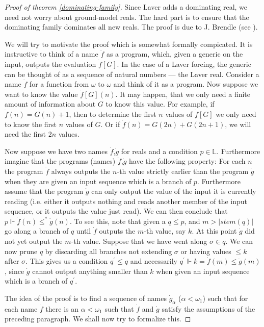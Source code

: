 \documentclass[a4paper,11pt,oneside]{mybook}
\def\force{\Vdash}
\theoremstyle{theorem}
\theoremstyle{example}
\begin{document}
\begin{proof}[Proof of theorem \ref{dominating-family}] Since Laver adds a dominating real, we need not worry about ground-model reals. The hard part is to ensure that the dominating family dominates all new reals. The proof is due to J. Brendle (see \cite{brendle-combinatorial}).

We will try to motivate the proof which is somewhat formally compicated. It is instructive to think of a name $\dot{f}$ as a program, which, given a generic on the input,
outputs the evaluation $\dot{f}[G]$. In the case of a Laver forcing, the generic can be thought of as a sequence of natural numbers --- the Laver real. Consider a name
$\dot{f}$ for a function from $\omega$ to $\omega$ and think of it as a program. Now suppose we want to know the value $\dot{f}[G](n)$. It may happen, that we only need a finite amount of information about $G$ to know this value. For example, if $\dot{f}(n)=G(n)+1$, then to determine the first $n$ values of $\dot{f}[G]$ we only need to
know the first $n$ values of $G$. Or if $\dot{f}(n)=G(2n)+G(2n+1)$, we will need the first $2n$ values.

Now suppose we have two names $\dot{f}$,$\dot{g}$ for reals and a condition $p\in\mathbb{L}$. Furthermore imagine that the programs (names) $\dot{f}$,$\dot{g}$ have the following property: For each $n$ the program $\dot{f}$ always outputs the $n$-th value strictly earlier than the program $\dot{g}$ when they are given an input sequence which is a branch of $p$. Furthermore assume that the program $\dot{g}$ can only output the value of the input it is currently reading (i.e. either it outputs nothing and reads another member of the input sequence, or it outputs the value just read). We can then conclude that $p\force \dot{f}(n)\leq^*\dot{g}(n)$. To see this, note that given a $q\leq p$, and $m>|stem(q)|$ go along a branch of $q$ until $\dot{f}$ outputs the $m$-th value, say $k$. At this point $\dot{g}$ did not yet output the $m$-th value. Suppose that we have went along $\sigma\in q$. We can now prune $q$ by discarding all branches not extending $\sigma$ or having values $\leq k$ after $\sigma$. This gives us a condition $q^\prime\leq q$ and necessarily $q^\prime\force k=\dot{f}(m)\leq\dot{g}(m)$, since $\dot{g}$ cannot output anything smaller than $k$ when given an input sequence which is a branch of $q^\prime$.

The idea of the proof is to find a sequence of names $\dot{g}_\alpha$ ($\alpha<\omega_1$) such that for each name $\dot{f}$ there is an $\alpha<\omega_1$ such that $\dot{f}$ and $\dot{g}$ satisfy the assumptions of the preceding paragraph. We shall now try to formalize this.



\end{proof}
\end{document}
